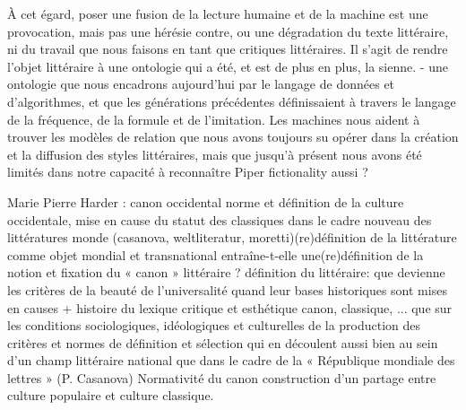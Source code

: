 À cet égard, poser une fusion de la lecture humaine et de la machine est une provocation, mais pas une hérésie contre, ou une dégradation du texte littéraire, ni du travail que nous faisons en tant que critiques littéraires. Il s'agit de rendre l'objet littéraire à une ontologie qui a été, et est de plus en plus, la sienne. - une ontologie que nous encadrons aujourd'hui par le langage de données et d'algorithmes, et que les générations précédentes définissaient à travers le langage de la fréquence, de la formule et de l'imitation. Les machines nous aident à trouver les modèles de relation que nous avons toujours su opérer dans la création et la diffusion des styles littéraires, mais que jusqu'à présent nous avons été limités dans notre capacité à reconnaître Piper fictionality aussi ?



Marie Pierre Harder : canon occidental norme et définition de la culture occidentale, mise en cause du statut des classiques dans le cadre nouveau des littératures monde (casanova, weltliteratur, moretti)(re)définition de la littérature comme objet mondial et transnational entraîne-t-elle une(re)définition de la notion et fixation du « canon » littéraire ? définition du littéraire: que devienne les critères de la beauté de l'universalité quand leur bases historiques sont mises en causes + histoire du lexique critique et esthétique canon, classique, ... que sur les conditions sociologiques, idéologiques et culturelles de la production des critères et normes de définition et sélection qui en découlent aussi bien au sein d’un champ littéraire national que dans le cadre de la « République mondiale des lettres » (P. Casanova) Normativité du canon construction d'un partage entre culture populaire et culture classique.

 